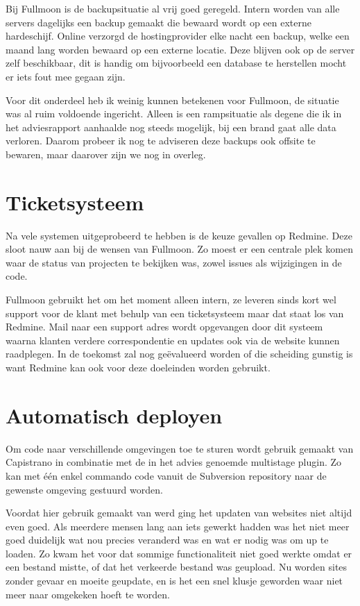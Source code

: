 Bij Fullmoon is de backupsituatie al vrij goed geregeld. Intern worden van alle servers dagelijks een backup gemaakt die bewaard wordt op een externe hardeschijf. Online verzorgd de hostingprovider elke nacht een backup, welke een maand lang worden bewaard op een externe locatie. Deze blijven ook op de server zelf beschikbaar, dit is handig om bijvoorbeeld een database te herstellen mocht er iets fout mee gegaan zijn.

Voor dit onderdeel heb ik weinig kunnen betekenen voor Fullmoon, de situatie was al ruim voldoende ingericht. Alleen is een rampsituatie als degene die ik in het adviesrapport aanhaalde nog steeds mogelijk, bij een brand gaat alle data verloren. Daarom probeer ik nog te adviseren deze backups ook offsite te bewaren, maar daarover zijn we nog in overleg.

\section{Ticketsysteem}

Na vele systemen uitgeprobeerd te hebben is de keuze gevallen op Redmine. Deze sloot nauw aan bij de wensen van Fullmoon. Zo moest er een centrale plek komen waar de status van projecten te bekijken was, zowel issues als wijzigingen in de code.

Fullmoon gebruikt het om het moment alleen intern, ze leveren sinds kort wel support voor de klant met behulp van een ticketsysteem maar dat staat los van Redmine. Mail naar een support adres wordt opgevangen door dit systeem waarna klanten verdere correspondentie en updates ook via de website kunnen raadplegen. In de toekomst zal nog geëvalueerd worden of die scheiding gunstig is want Redmine kan ook voor deze doeleinden worden gebruikt.

\section{Automatisch deployen}

Om code naar verschillende omgevingen toe te sturen wordt gebruik gemaakt van Capistrano in combinatie met de in het advies genoemde multistage plugin. Zo kan met één enkel commando code vanuit de Subversion repository naar de gewenste omgeving gestuurd worden.

Voordat hier gebruik gemaakt van werd ging het updaten van websites niet altijd even goed. Als meerdere mensen lang aan iets gewerkt hadden was het niet meer goed duidelijk wat nou precies veranderd was en wat er nodig was om up te loaden. Zo kwam het voor dat sommige functionaliteit niet goed werkte omdat er een bestand mistte, of dat het verkeerde bestand was geupload. Nu worden sites zonder gevaar en moeite geupdate, en is het een snel klusje geworden waar niet meer naar omgekeken hoeft te worden.

